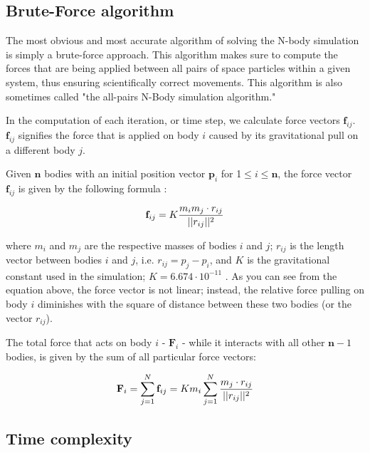 \documentclass[journal]{IEEEtran}
\begin{document}
		\subsection*{Brute-Force algorithm}
			The most obvious and most accurate algorithm of solving the N-body simulation is simply a brute-force approach. This algorithm makes sure to compute the forces that are being applied between all pairs of space particles within a given system, thus ensuring scientifically correct movements. This algorithm is also sometimes called "the all-pairs N-Body simulation algorithm."
			
			In the computation of each iteration, or time step, we calculate force vectors $\textbf{f}_{ij}$. $\textbf{f}_{ij}$ signifies the force that is applied on body $i$ caused by its gravitational pull on a different body $j$. 
			
			Given $\textbf{n}$ bodies with an initial position vector $\textbf{p}_{i}$ for 1$ \leq i \leq \textbf{n}$, the force vector $\textbf{f}_{ij}$ is given by the following formula \cite{nvidia-article}:
			
			\begin{equation}
			\centering
				\textbf{f}_{ij} = K \frac{m_i m_j \cdot r_{ij}}{||r_{ij}||^2} 
			\end{equation}
			
			where $m_i$ and $m_j$ are the respective masses of bodies $i$ and $j$; $r_{ij}$ is the length vector between bodies $i$ and $j$, i.e. $r_{ij} = p_j - p_i$, and $K$ is the gravitational constant used in the simulation; $K = 6.674 \cdot 10^{-11}$ \cite{constant}. As you can see from the equation above, the force vector is not linear; instead, the relative force pulling on body $i$ diminishes with the square of distance between these two bodies (or the vector $r_{ij}$).
			
			The total force that acts on body $i$ - $\textbf{F}_i$ - while it interacts with all other $\textbf{n}-1$ bodies, is given by the sum of all particular force vectors:
			
			\begin{equation}
			\centering
				\textbf{F}_i = \sum_{j = 1}^{N}\textbf{f}_{ij}
				 = K m_i \sum_{j = 1}^{N}{\frac{m_j \cdot r_{ij}}{||r_{ij}||^2}}
			\end{equation}
			
			\subsection*{Time complexity}
			
\end{document}
